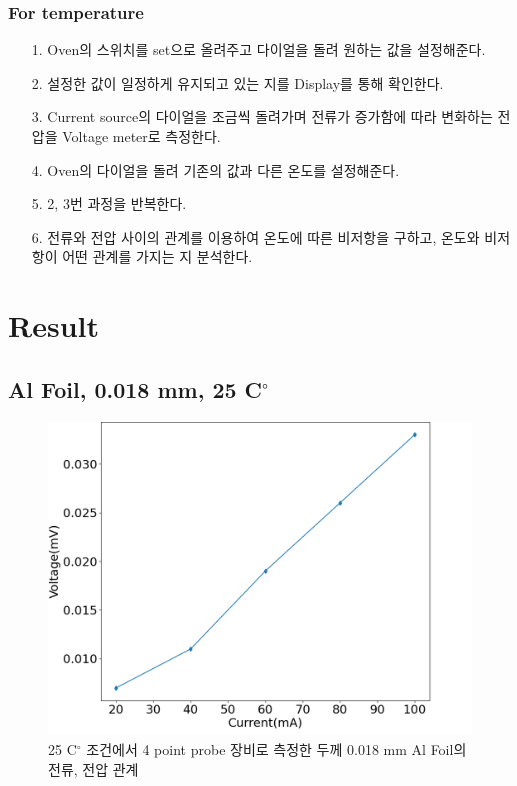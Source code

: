 \documentclass[aps,reprint,superscriptaddress,10pt]{revtex4-2}
\begin{document}
 
 \subsubsection{For temperature}
 \begin{itemize}
     \item[1. ]
     Oven의 스위치를 set으로 올려주고 다이얼을 돌려 원하는 값을 설정해준다.
     \item[2. ]
     설정한 값이 일정하게 유지되고 있는 지를 Display를 통해 확인한다. 
     \item[3. ]
     Current source의 다이얼을 조금씩 돌려가며 전류가 증가함에 따라 변화하는 전압을 
     Voltage meter로 측정한다. 
     \item[4. ]
     Oven의 다이얼을 돌려 기존의 값과 다른 온도를 설정해준다.
     \item[5. ]
     2, 3번 과정을 반복한다. 
     \item[6. ]
     전류와 전압 사이의 관계를 이용하여 온도에 따른 비저항을 구하고, 
     온도와 비저항이 어떤 관계를 가지는 지 분석한다.
 
 \end{itemize}

\section{Result}
\subsection{Al Foil, 0.018 mm, 25 C$^\circ$}
\begin{figure}[htbp]
    \centering
    \includegraphics[scale = 0.25]{Al1.png}
    \caption{25 C$^\circ$ 조건에서 4 point probe 장비로 측정한 
    두께 0.018 mm Al Foil의 전류, 전압 관계}
    \label{Al1}
  \end{figure}
\end{document}

